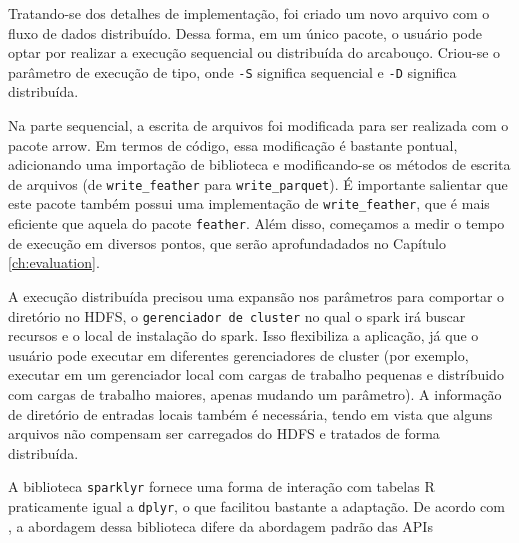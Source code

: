 Tratando-se dos detalhes de implementação, foi criado um novo arquivo com o fluxo de dados distribuído.
Dessa forma, em um único pacote, o usuário pode optar por realizar a execução sequencial ou distribuída do arcabouço.
Criou-se o parâmetro de execução de tipo, onde \texttt{-S} significa sequencial e \texttt{-D} significa distribuída.

Na parte sequencial, a escrita de arquivos foi modificada para ser realizada com o pacote arrow. Em termos de código, essa
modificação é bastante pontual, adicionando uma importação de biblioteca e modificando-se os métodos de escrita de arquivos
(de \texttt{write\_feather} para \texttt{write\_parquet}). É importante salientar que este pacote também possui uma implementação
de \texttt{write\_feather}, que é mais eficiente que aquela do pacote \texttt{feather}. Além disso, começamos a medir o tempo de
execução em diversos pontos, que serão aprofundadados no Capítulo \ref{ch:evaluation}.

A execução distribuída precisou uma expansão nos parâmetros para comportar o diretório no HDFS, o \texttt{gerenciador de cluster} 
no qual o spark irá buscar recursos e o local de instalação do spark. Isso flexibiliza a aplicação, já que o usuário pode executar 
em diferentes gerenciadores de cluster (por exemplo, executar em um gerenciador local com cargas de trabalho pequenas e distríbuido
com cargas de trabalho maiores, apenas mudando um parâmetro). A informação de diretório de entradas locais também é necessária, 
tendo em vista que alguns arquivos não compensam ser carregados do HDFS e tratados de forma distribuída.

A biblioteca \texttt{sparklyr} fornece uma forma de interação com tabelas R praticamente igual a \texttt{dplyr}, o que 
facilitou bastante a adaptação. De acordo com \citet{}, a abordagem dessa biblioteca difere da abordagem padrão das APIs 
